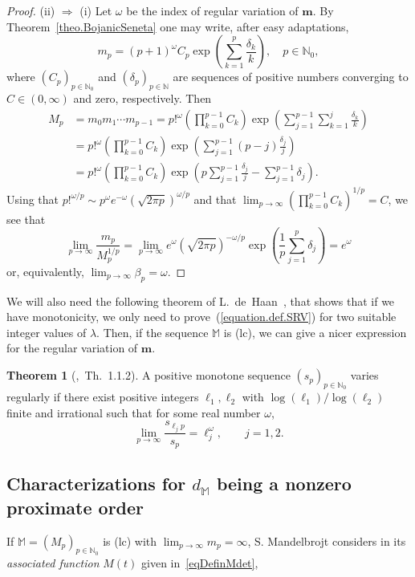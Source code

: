 \documentclass[11pt,a4paper]{article}
\theoremstyle{definition}
\newtheorem{theo}{Theorem}[section]
\def\oo{\infty}
\def\ri{\rightarrow}
\def\b{\beta}
\def\o{\omega}
\def\N{\mathbb{N}}
\def\M{\mathbb{M}}
\def\m{\boldsymbol{m}}
\begin{document}
\begin{proof}
(ii) $\Rightarrow$ (i) Let $\o$ be the index of regular variation of $\m$. By Theorem~\ref{theo.BojanicSeneta} one may write, after easy adaptations,
$$m_p=(p+1)^{\o} C_p \exp  \left(\sum^{p}_{k=1}\frac{\delta_k}{k}\right),\quad p\in\N_0, $$
where $(C_p)_{p\in\N_0}$ and $(\delta_p)_{p\in\N}$ are sequences of positive numbers converging to $C\in(0,\oo)$ and zero,
respectively. Then
\begin{align*}
 M_p &= m_0m_1\cdots m_{p-1}=p!^{\o} \left(\prod_{k=0}^{p-1} C_k \right)\exp  \left(\sum^{p-1}_{j=1} \sum^{j}_{k=1}\frac{\delta_k}{k}\right)\\
 & =
p!^{\o} \left(\prod_{k=0}^{p-1} C_k\right) \exp  \left(\sum^{p-1}_{j=1} (p-j)\frac{\delta_j}{j}\right) \\
&= p!^{\o} \left(\prod_{k=0}^{p-1} C_k\right) \exp  \left(p\sum^{p-1}_{j=1} \frac{\delta_j}{j} - \sum^{p-1}_{j=1} \delta_j \right).
\end{align*}
Using that $p!^{\o/p}\sim p^{\o} e^{-\o} (\sqrt{2\pi p})^{\o/p}$ and that
$\lim_{p\ri\oo} \left(\prod_{k=0}^{p-1} C_k\right)^{1/p}=C $,
we see that
$$\lim_{p\ri\oo} \frac{m_p}{M^{1/p}_p} =\lim_{p\ri\oo} e^{\o} (\sqrt{2\pi p})^{-\o/p} \exp  \left( \frac{1}{p} \sum^{p}_{j=1}\delta_j \right)=e^{\o}$$
or, equivalently, $\lim_{p\ri\oo} \b_p=\o$.
\end{proof}


We will also need the following theorem of L.~de~Haan~\cite{haan}, that shows that if we have monotonicity,
we only need to prove~(\ref{equation.def.SRV}) for two suitable integer values of $\lambda$. Then, if the sequence $\M$ is (lc),
we can give a nicer expression for the regular variation of $\m$.

\begin{theo}[\cite{haan},\ Th.\ 1.1.2] \label{theo.de.haan}
A positive monotone sequence $(s_p)_{p\in\N_0}$ varies regularly if there exist
positive integers $\ell_1,\ell_2$ with $\log(\ell_1)/\log(\ell_2)$ finite and irrational such that for some real number $\o$,
$$\lim_{p\ri\oo} \frac{s_{\ell_j p}}{s_p}=\ell_j^{\o}, \qquad j=1,2.$$
\end{theo}

\subsection{Characterizations for $d_{\M}$ being a nonzero proximate order}

If $\M=(M_p)_{p\in\N_0}$ is (lc) with $\lim_{p\to\infty} m_p=\infty$,
S. Mandelbrojt considers in \cite{mandelbrojt} its \textit{associated function} $M(t)$ given in~\eqref{eqDefinMdet},
\end{document}
